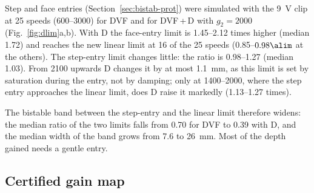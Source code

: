 Step and face entries (Section~\ref{sec:bistab-prot}) were simulated with the \SI{9}{\volt} clip at 25 speeds (\SIrange{600}{3000}{\rpm}) for DVF and for DVF\,+\,D with $g_2=2000$ (Fig.~\ref{fig:dlim}a,b). With D the face-entry limit is 1.45--2.12 times higher (median 1.72) and reaches the new linear limit at 16 of the 25 speeds (0.85--$0.98\alim$ at the others). The step-entry limit changes little: the ratio is 0.98--1.27 (median 1.03). From \SI{2100}{\rpm} upwards D changes it by at most \SI{1.1}{\milli\metre}, as this limit is set by saturation during the entry, not by damping; only at \SIrange{1400}{2000}{\rpm}, where the step entry approaches the linear limit, does D raise it markedly (1.13--1.27 times).

The bistable band between the step-entry and the linear limit therefore widens: the median ratio of the two limits falls from 0.70 for DVF to 0.39 with D, and the median width of the band grows from 7.6 to \SI{26}{\milli\metre}. Most of the depth gained needs a gentle entry.

\subsection{Certified gain map}\label{sec:delayed-map}

